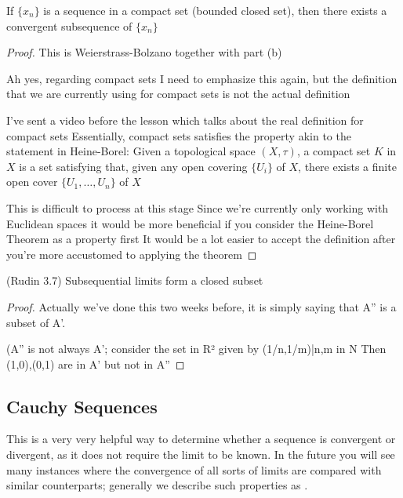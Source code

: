 \begin{proposition}
If $\{x_n\}$ is a sequence in a compact set (bounded closed set), then there exists a convergent subsequence of $\{x_n\}$
\end{proposition}

\begin{proof}
This is Weierstrass-Bolzano together with part (b)

Ah yes, regarding compact sets
I need to emphasize this again, but the definition that we are currently using for compact sets is not the actual definition

I've sent a video before the lesson which talks about the real definition for compact sets %
Essentially, compact sets satisfies the property akin to the statement in Heine-Borel:
Given a topological space $(X,\tau)$, a compact set $K$ in $X$ is a set satisfying that, given any open covering $\{U_i\}$ of $X$, there exists a finite open cover $\{U_1,\dots,U_n\}$ of $X$

This is difficult to process at this stage
Since we're currently only working with Euclidean spaces it would be more beneficial if you consider the Heine-Borel Theorem as a property first
It would be a lot easier to accept the definition after you're more accustomed to applying the theorem
\end{proof}

\begin{proposition}
(Rudin 3.7) Subsequential limits form a closed subset
\end{proposition}

\begin{proof}
Actually we've done this two weeks before, it is simply saying that A'' is a subset of A'.

(A'' is not always A'; consider the set in R² given by
{(1/n,1/m)|n,m in N}
Then (1,0),(0,1) are in A' but not in A''
\end{proof}

\subsection{Cauchy Sequences}
This is a very very helpful way to determine whether a sequence is convergent or divergent, as it does not require the limit to be known. In the future you will see many instances where the convergence of all sorts of limits are compared with similar counterparts; generally we describe such properties as .


